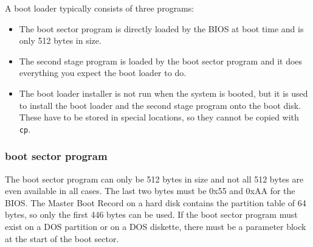 \documentclass[12pt,a4paper]{article}
\begin{document}
A boot loader typically consists of three programs:
\begin{itemize}
\item The boot sector program is directly loaded by the BIOS at boot
  time and is only 512 bytes in size. 
\item The second stage program is loaded by the boot sector program
  and it does everything you expect the boot loader to do.
\item The boot loader installer is not run when the system is booted,
  but it is used to install the boot loader and the second stage
  program onto the boot disk. These have to be stored in special
  locations, so they cannot be copied with {\tt cp}.
\end{itemize}


\subsubsection{boot sector program}

The boot sector program can only be 512 bytes in size and not all 512
bytes are even available in all cases. The last two bytes must be 0x55
and 0xAA for the BIOS. The Master Boot Record on a hard disk contains
the partition table of 64 bytes, so only the first 446 bytes can be used.
If the boot sector program must exist on a DOS partition or on a DOS
diskette, there must be a parameter block at the start of the boot sector.
\end{document}
